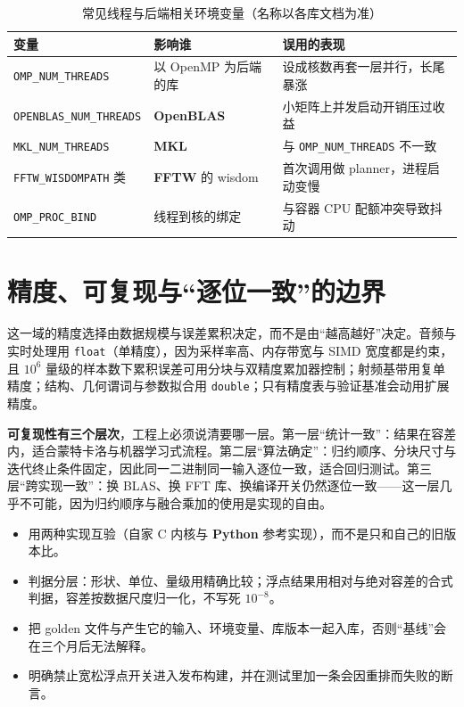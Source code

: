 \documentclass[12pt,a4paper,fontset=fandol]{ctexbook}
\newcommand{\Tp}[1]{\texttt{#1}}
\newcommand{\Lib}[1]{\textbf{#1}}
\newcommand{\Lang}[1]{\textsf{\bfseries #1}}
\newcommand{\PY}{\Lang{Python}}
\begin{document}
\begin{table}[H]
\centering
\caption{常见线程与后端相关环境变量（名称以各库文档为准）}
\label{tab:ch03-env}
\small
\begin{tabular}{@{}>{\raggedright\arraybackslash}p{}
  >{\raggedright\arraybackslash}p{}
  >{\raggedright\arraybackslash}p{}@{}}
\toprule
变量 & 影响谁 & 误用的表现 \\
\midrule
\Tp{OMP\_NUM\_THREADS} &
  以 OpenMP 为后端的库 &
  设成核数再套一层并行，长尾暴涨 \\
\Tp{OPENBLAS\_NUM\_THREADS} &
  \Lib{OpenBLAS} &
  小矩阵上并发启动开销压过收益 \\
\Tp{MKL\_NUM\_THREADS} &
  \Lib{MKL} &
  与 \Tp{OMP\_NUM\_THREADS} 不一致 \\
\Tp{FFTW\_WISDOMPATH} 类 &
  \Lib{FFTW} 的 wisdom &
  首次调用做 planner，进程启动变慢 \\
\Tp{OMP\_PROC\_BIND} &
  线程到核的绑定 &
  与容器 CPU 配额冲突导致抖动 \\
\bottomrule
\end{tabular}
\end{table}

\section{精度、可复现与``逐位一致''的边界}

这一域的精度选择由数据规模与误差累积决定，而不是由``越高越好''决定。音频与实时处理用 \Tp{float}（单精度），因为采样率高、内存带宽与 SIMD 宽度都是约束，且 $10^6$ 量级的样本数下累积误差可用分块与双精度累加器控制；射频基带用复单精度；结构、几何谓词与参数拟合用 \Tp{double}；只有精度表与验证基准会动用扩展精度。

\textbf{可复现性有三个层次}，工程上必须说清要哪一层。第一层``统计一致''：结果在容差内，适合蒙特卡洛与机器学习式流程。第二层``算法确定''：归约顺序、分块尺寸与迭代终止条件固定，因此同一二进制同一输入逐位一致，适合回归测试。第三层``跨实现一致''：换 BLAS、换 FFT 库、换编译开关仍然逐位一致——这一层几乎不可能，因为归约顺序与融合乘加的使用是实现的自由。

\begin{bestpractice}[title={对拍测试的分工}]
\begin{itemize}
\item 用两种实现互验（自家 C 内核与 \PY{} 参考实现），而不是只和自己的旧版本比。
\item 判据分层：形状、单位、量级用精确比较；浮点结果用相对与绝对容差的合式判据，容差按数据尺度归一化，不写死 $10^{-8}$。
\item 把 golden 文件与产生它的输入、环境变量、库版本一起入库，否则``基线''会在三个月后无法解释。
\item 明确禁止宽松浮点开关进入发布构建，并在测试里加一条会因重排而失败的断言。
\end{itemize}
\end{bestpractice}
\end{document}
